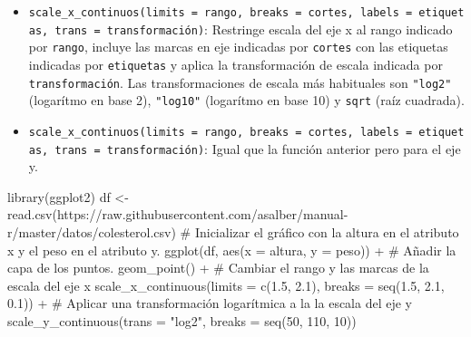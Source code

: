 \documentclass[
  a4paper,
]{scrreport}
\newenvironment{Shaded}{\begin{snugshade}}{\end{snugshade}}
\newcommand{\AttributeTok}[1]{\textcolor[rgb]{0.40,0.45,0.13}{#1}}
\newcommand{\CommentTok}[1]{\textcolor[rgb]{0.37,0.37,0.37}{#1}}
\newcommand{\DecValTok}[1]{\textcolor[rgb]{0.68,0.00,0.00}{#1}}
\newcommand{\FloatTok}[1]{\textcolor[rgb]{0.68,0.00,0.00}{#1}}
\newcommand{\FunctionTok}[1]{\textcolor[rgb]{0.28,0.35,0.67}{#1}}
\newcommand{\NormalTok}[1]{\textcolor[rgb]{0.00,0.23,0.31}{#1}}
\newcommand{\OtherTok}[1]{\textcolor[rgb]{0.00,0.23,0.31}{#1}}
\newcommand{\SpecialCharTok}[1]{\textcolor[rgb]{0.37,0.37,0.37}{#1}}
\newcommand{\StringTok}[1]{\textcolor[rgb]{0.13,0.47,0.30}{#1}}
\theoremstyle{definition}
\theoremstyle{definition}
\theoremstyle{remark}
\begin{document}
\begin{itemize}
\item
  \texttt{scale\_x\_continuos(limits\ =\ rango,\ breaks\ =\ cortes,\ labels\ =\ etiquetas,\ trans\ =\ transformación)}:
  Restringe escala del eje x al rango indicado por \texttt{rango},
  incluye las marcas en eje indicadas por \texttt{cortes} con las
  etiquetas indicadas por \texttt{etiquetas} y aplica la transformación
  de escala indicada por \texttt{transformación}. Las transformaciones
  de escala más habituales son \texttt{"log2"} (logarítmo en base 2),
  \texttt{"log10"} (logarítmo en base 10) y \texttt{sqrt} (raíz
  cuadrada).
\item
  \texttt{scale\_x\_continuos(limits\ =\ rango,\ breaks\ =\ cortes,\ labels\ =\ etiquetas,\ trans\ =\ transformación)}:
  Igual que la función anterior pero para el eje y.
\end{itemize}

\begin{Shaded}
\begin{Highlighting}[]
\FunctionTok{library}\NormalTok{(ggplot2)}
\NormalTok{df }\OtherTok{\textless{}{-}} \FunctionTok{read.csv}\NormalTok{(}\StringTok{\textquotesingle{}https://raw.githubusercontent.com/asalber/manual{-}r/master/datos/colesterol.csv\textquotesingle{}}\NormalTok{)}
\CommentTok{\# Inicializar el gráfico con la altura en el atributo x y el peso en el atributo y.}
\FunctionTok{ggplot}\NormalTok{(df, }\FunctionTok{aes}\NormalTok{(}\AttributeTok{x =}\NormalTok{ altura, }\AttributeTok{y =}\NormalTok{ peso)) }\SpecialCharTok{+}
\CommentTok{\# Añadir la capa de los puntos.}
    \FunctionTok{geom\_point}\NormalTok{() }\SpecialCharTok{+}
\CommentTok{\# Cambiar el rango y las marcas de la escala del eje x}
    \FunctionTok{scale\_x\_continuous}\NormalTok{(}\AttributeTok{limits =} \FunctionTok{c}\NormalTok{(}\FloatTok{1.5}\NormalTok{, }\FloatTok{2.1}\NormalTok{), }\AttributeTok{breaks =} \FunctionTok{seq}\NormalTok{(}\FloatTok{1.5}\NormalTok{, }\FloatTok{2.1}\NormalTok{, }\FloatTok{0.1}\NormalTok{)) }\SpecialCharTok{+}
\CommentTok{\# Aplicar una transformación logarítmica a la la escala del eje y}
    \FunctionTok{scale\_y\_continuous}\NormalTok{(}\AttributeTok{trans =} \StringTok{"log2"}\NormalTok{, }\AttributeTok{breaks =} \FunctionTok{seq}\NormalTok{(}\DecValTok{50}\NormalTok{, }\DecValTok{110}\NormalTok{, }\DecValTok{10}\NormalTok{))}
\end{Highlighting}
\end{Shaded}
\end{document}
